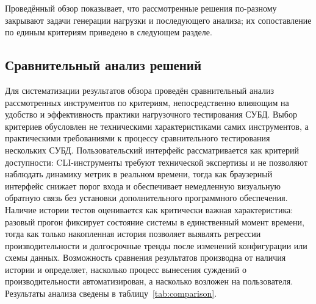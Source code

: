 Проведённый обзор показывает, что рассмотренные решения по-разному закрывают задачи генерации нагрузки и последующего анализа; их сопоставление по единым критериям приведено в следующем разделе.

\subsection{Сравнительный анализ решений}

Для систематизации результатов обзора проведён сравнительный анализ рассмотренных инструментов по критериям, непосредственно влияющим на удобство и эффективность практики нагрузочного тестирования СУБД. Выбор критериев обусловлен не техническими характеристиками самих инструментов, а практическими требованиями к процессу сравнительного тестирования нескольких СУБД. Пользовательский интерфейс рассматривается как критерий доступности: CLI-инструменты требуют технической экспертизы и не позволяют наблюдать динамику метрик в реальном времени, тогда как браузерный интерфейс снижает порог входа и обеспечивает немедленную визуальную обратную связь без установки дополнительного программного обеспечения. Наличие истории тестов оценивается как критически важная характеристика: разовый прогон фиксирует состояние системы в единственный момент времени, тогда как только накопленная история позволяет выявлять регрессии производительности и долгосрочные тренды после изменений конфигурации или схемы данных. Возможность сравнения результатов производна от наличия истории и определяет, насколько процесс вынесения суждений о производительности автоматизирован, а насколько возложен на пользователя. Результаты анализа сведены в таблицу~\ref{tab:comparison}.

